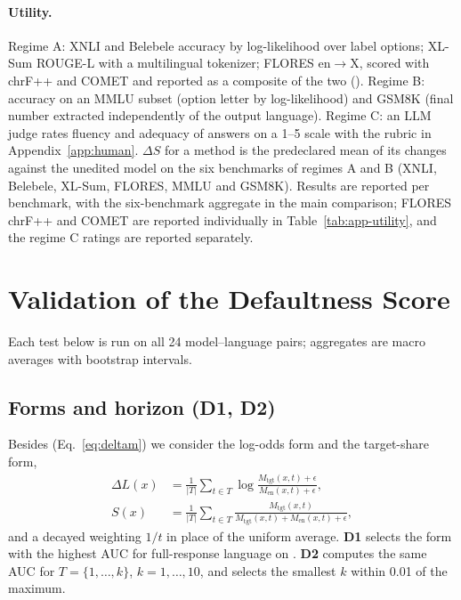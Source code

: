 \paragraph{Utility.}
Regime A: XNLI \citep{xnli} and Belebele \citep{bandarkar2024belebele} accuracy by log-likelihood over label options; XL-Sum \citep{xlsum} ROUGE-L with a multilingual tokenizer; FLORES en$\rightarrow$X, scored with chrF++ \citep{popovic2017chrf} and COMET \citep{rei2020comet} and reported as a composite of the two (). Regime B: accuracy on an MMLU subset \citep{hendrycks2021mmlu} (option letter by log-likelihood) and GSM8K \citep{cobbe2021gsm8k} (final number extracted independently of the output language). Regime C: an LLM judge rates fluency and adequacy of \nocue answers on a 1--5 scale with the rubric in Appendix~\ref{app:human}. $\Delta S$ for a method is the predeclared mean of its changes against the unedited model on the six benchmarks of regimes A and B (XNLI, Belebele, XL-Sum, FLORES, MMLU and GSM8K). Results are reported per benchmark, with the six-benchmark aggregate in the main comparison; FLORES chrF++ and COMET are reported individually in Table~\ref{tab:app-utility}, and the regime C ratings are reported separately.

\FloatBarrier
\section{Validation of the Defaultness Score}
\label{app:metric-suite}

Each test below is run on all 24 model--language pairs; aggregates are macro averages with bootstrap intervals.

\FloatBarrier
\subsection{Forms and horizon (D1, D2)}
\label{app:metric-forms}

Besides \dM (Eq.~\ref{eq:deltam}) we consider the log-odds form and the target-share form,
\begin{equation*}
\begin{aligned}
\Delta L(x)&=\frac{1}{|T|}\sum_{t\in T}\log\frac{M_{\mathrm{tgt}}(x,t)+\epsilon}{M_{\mathrm{en}}(x,t)+\epsilon},\\
S(x)&=\frac{1}{|T|}\sum_{t\in T}\frac{M_{\mathrm{tgt}}(x,t)}{M_{\mathrm{tgt}}(x,t)+M_{\mathrm{en}}(x,t)+\epsilon},
\end{aligned}
\end{equation*}
and a decayed weighting $1/t$ in place of the uniform average. \textbf{D1} selects the form with the highest AUC for full-response language on \Ddev. \textbf{D2} computes the same AUC for $T=\{1,\dots,k\}$, $k=1,\dots,10$, and selects the smallest $k$ within 0.01 of the maximum.

